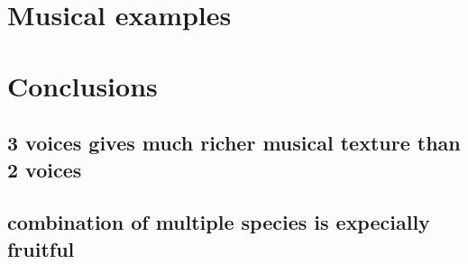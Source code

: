 



\section{Musical examples}
\section{Conclusions}
\subsection*{3 voices gives much richer musical texture than 2 voices}
\subsection*{combination of multiple species is expecially fruitful}
